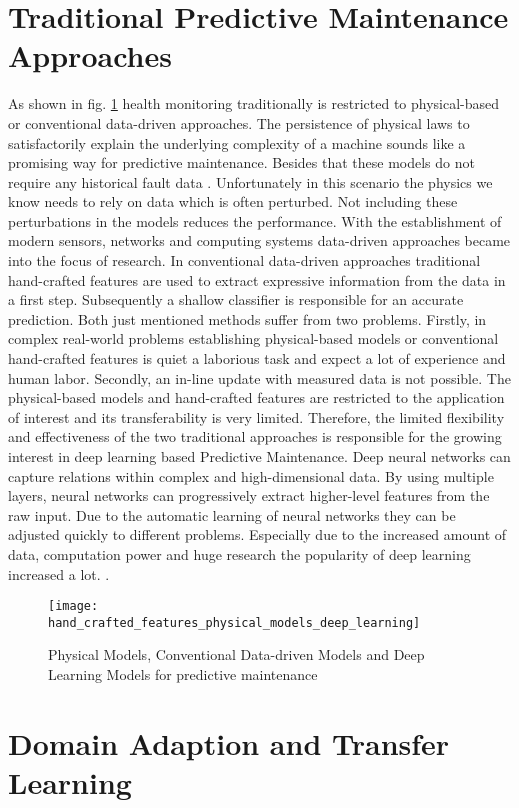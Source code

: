 \section{Traditional Predictive Maintenance Approaches}
As shown in fig. \ref{fig:hand_crafted_features_physical_models_deep_learning} health monitoring traditionally is restricted to physical-based or conventional data-driven approaches. The persistence of  physical laws to satisfactorily explain the underlying complexity of a machine sounds like a promising way for predictive maintenance. Besides that these models do not require any historical fault data \cite{AN201942}. Unfortunately in this scenario the physics we know needs to rely on data which is often perturbed. Not including these perturbations in the models reduces the performance. With the establishment of modern sensors, networks and computing systems data-driven approaches became into the focus of research. In conventional data-driven approaches traditional hand-crafted features are used to extract expressive information from the data in a first step. Subsequently a shallow classifier is responsible for an accurate prediction. Both just mentioned methods suffer from two problems. Firstly, in complex real-world problems establishing physical-based models or conventional hand-crafted features is quiet a laborious task and expect a lot of experience and human labor. Secondly, an in-line update with measured data is not possible. The physical-based models and hand-crafted features are restricted to the application of interest and its transferability is very limited. Therefore, the limited flexibility and effectiveness of the two traditional approaches is responsible for the growing interest in deep learning based Predictive Maintenance. Deep neural networks can capture relations within complex and high-dimensional data. By using multiple layers, neural networks can progressively extract higher-level features from the raw input. Due to the automatic learning of neural networks they can be adjusted quickly to different problems. Especially due to the increased amount of data, computation power and huge research the popularity of deep learning increased a lot.  \cite{ZHAO2019213} \cite{AZAMFAR2020103932}. 

\begin{figure}[htpb]
  \centering
  \texttt{[image: hand\_crafted\_features\_physical\_models\_deep\_learning]}
  \caption {Physical Models, Conventional Data-driven Models and Deep Learning Models for predictive maintenance \cite{ZHAO2019213}} \label{fig:hand_crafted_features_physical_models_deep_learning}
\end{figure}

\section{Domain Adaption and Transfer Learning}
